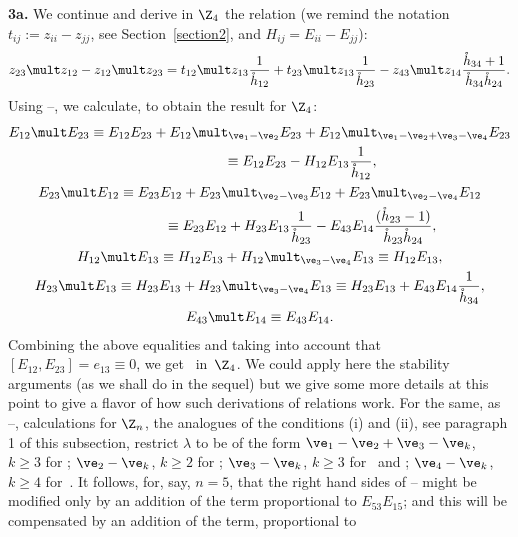 \documentclass[pdftex]{sigma}
\def\nplus{\mathfrak{n}}\def\nn{\nonumber}\def\nin{\noindent}
\def\s{z}\def\S{\mathrm {S}}\def\si{\sigma}\def\Sp{\S^{\nplus}}\def\sy{\acute{\sigma}}\def\th{\mathring{h}}
\numberwithin{equation}{section}
\begin{document}
{\bf 3a.} We continue and derive in $\Z_4$ the relation (we remind the notation $t_{ij}:=\s_{ii}-\s_{jj}$,
see Section~\ref{section2},
and $H_{ij}=E_{ii}-E_{jj}$):
\begin{gather} \label{proof12}
\s_{23}\mult\s_{12}-\s_{12}\mult\s_{23}=t_{12}\mult\s_{13}
 \frac{1}{\th_{12}}+t_{23}\mult\s_{13}  \frac{1}{\th_{23}}-\s_{43}\mult\s_{14}  \frac{\th_{34}+1}{\th_{34}\th_{24}}  .
\end{gather}
Using --, we calculate, to obtain the result for $\Z_4$:
\begin{gather}E_{12}\mult E_{23} \equiv E_{12}E_{23}+ E_{12}\mult_{\ve_1-\ve_2} E_{23}+
E_{12}\mult_{\ve_1-\ve_2+\ve_3-\ve_4} E_{23} \nonumber\\
\phantom{E_{12}\mult E_{23}}{}
 \equiv E_{12}E_{23}-H_{12}E_{13} \frac{1}{\th_{12}}  ,\label{1223r1}\\
  E_{23}\mult E_{12} \equiv E_{23}E_{12}+ E_{23}\mult_{\ve_2-\ve_3} E_{12}+
E_{23}\mult_{\ve_2-\ve_4} E_{12}\notag\\
\phantom{E_{23}\mult E_{12}}{} \equiv E_{23}E_{12}+H_{23}E_{13}  \frac{1}{\th_{23}}-E_{43}E_{14} \frac{(\th_{23}-1)}{\th_{23}
\th_{24}} ,\label{1223r2}\\
  H_{12}\mult E_{13} \equiv H_{12} E_{13}+H_{12}\mult_{\ve_3-\ve_4} E_{13}\equiv
H_{12} E_{13}  ,\label{1223r3}\\
  H_{23}\mult E_{13} \equiv H_{23} E_{13}+H_{23}\mult_{\ve_3-\ve_4} E_{13}\equiv
H_{23} E_{13}+E_{43}E_{14}  \frac{1}{\th_{34}}  ,\label{1223r4}\\
  E_{43}\mult E_{14} \equiv E_{43}E_{14} .\label{1223r5}
  \end{gather}
Combining the above equalities and taking into account that $[E_{12},E_{23}]=e_{13}\equiv 0$,
we get~ in~$\Z_4$. We could apply here the stability arguments (as we shall do in the sequel)
but we give some more details at this point to give a f\/lavor of how such derivations of relations work.
For the same, as --, calculations for $\Z_n$, the analogues of the conditions (i)
and (ii), see paragraph 1 of this subsection, restrict $\lambda$ to be of the form $\ve_1-\ve_2+\ve_3-\ve_k$, $k\geq 3$ for
; $\ve_2-\ve_k$, $k\geq 2$ for ; $\ve_3-\ve_k$, $k\geq 3$ for~
and ; $\ve_4-\ve_k$, $k\geq 4$ for~. It follows, for, say, $n=5$, that the right
hand sides of -- might be modif\/ied only by an addition of the term proportional to
$E_{53}E_{15}$; and this will be compensated by an addition of the term, proportional to
\end{document}
